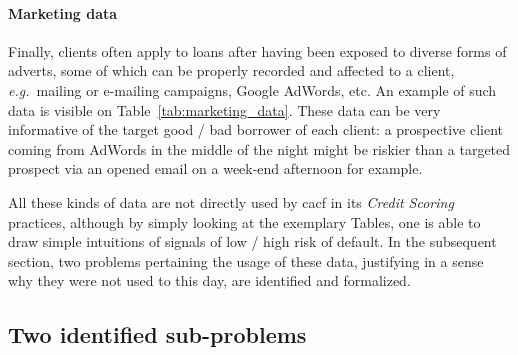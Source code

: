 \paragraph{Marketing data}

Finally, clients often apply to loans after having been exposed to diverse forms of adverts, some of which can be properly recorded and affected to a client, \textit{e.g.}\ mailing or e-mailing campaigns, Google AdWords, etc. An example of such data is visible on Table~\ref{tab:marketing_data}. These data can be very informative of the target good / bad borrower of each client: a prospective client coming from AdWords in the middle of the night might be riskier than a targeted prospect via an opened email on a week-end afternoon for example.

\begin{table}[ht]
    \centering
    \caption{Marketing data.}
    \label{tab:marketing_data}
\begin{tiny}
\end{tiny}
\end{table}

All these kinds of data are not directly used by \gls{cacf} in its \textit{Credit Scoring} practices, although by simply looking at the exemplary Tables, one is able to draw simple intuitions of signals of low / high risk of default. In the subsequent section, two problems pertaining the usage of these data, justifying in a sense why they were not used to this day, are identified and formalized.


\subsection{Two identified sub-problems}

